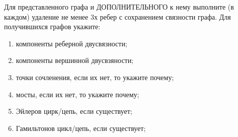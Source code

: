 \question
Для представленного графа и ДОПОЛНИТЕЛЬНОГО к нему выполните (в каждом) удаление не менее 3х ребер с сохранением связности графа. 
Для получившихся графов укажите: 
\begin{enumerate}
\item компоненты реберной двусвязности;
\item компоненты вершинной двусвзяности;
\item точки сочленения, если их нет, то укажите почему;
\item мосты, если их нет, то укажите почему;
\item Эйлеров цирк/цепь, если существует;
\item Гамильтонов цикл/цепь, если существует;
\end{enumerate}
\begin{figure}[h]

\begin{minipage}[h]{0.55\linewidth}
\end{minipage}
\begin{minipage}[h]{0.45\linewidth}
\end{minipage}
\end{figure}